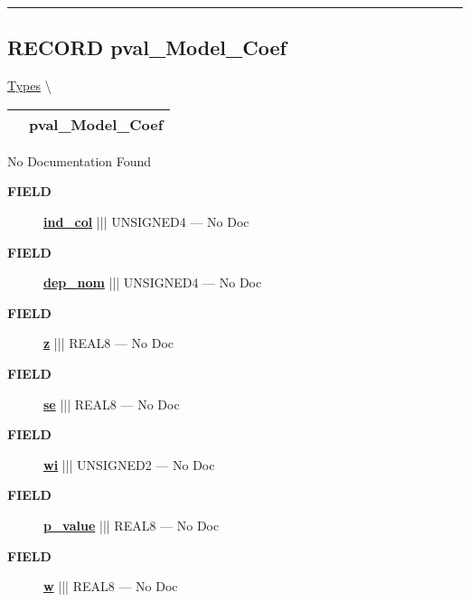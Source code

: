 \rule{\linewidth}{0.5pt}
\subsection*{\textsf{\colorbox{headtoc}{\color{white} RECORD}
pval\_Model\_Coef}}

\hypertarget{ecldoc:logisticregression.types.pval_model_coef}{}
\hspace{0pt} \hyperlink{ecldoc:LogisticRegression.Types}{Types} \textbackslash 

{\renewcommand{\arraystretch}{1.5}
\begin{tabularx}{\textwidth}{|>{\raggedright\arraybackslash}l|X|}
\hline
\hspace{0pt}\mytexttt{\color{red} } & \textbf{pval\_Model\_Coef} \\
\hline
\end{tabularx}
}

\par





No Documentation Found







\par
\begin{description}
\item [\colorbox{tagtype}{\color{white} \textbf{\textsf{FIELD}}}] \textbf{\underline{ind\_col}} ||| UNSIGNED4 --- No Doc
\item [\colorbox{tagtype}{\color{white} \textbf{\textsf{FIELD}}}] \textbf{\underline{dep\_nom}} ||| UNSIGNED4 --- No Doc
\item [\colorbox{tagtype}{\color{white} \textbf{\textsf{FIELD}}}] \textbf{\underline{z}} ||| REAL8 --- No Doc
\item [\colorbox{tagtype}{\color{white} \textbf{\textsf{FIELD}}}] \textbf{\underline{se}} ||| REAL8 --- No Doc
\item [\colorbox{tagtype}{\color{white} \textbf{\textsf{FIELD}}}] \textbf{\underline{wi}} ||| UNSIGNED2 --- No Doc
\item [\colorbox{tagtype}{\color{white} \textbf{\textsf{FIELD}}}] \textbf{\underline{p\_value}} ||| REAL8 --- No Doc
\item [\colorbox{tagtype}{\color{white} \textbf{\textsf{FIELD}}}] \textbf{\underline{w}} ||| REAL8 --- No Doc
\end{description}





